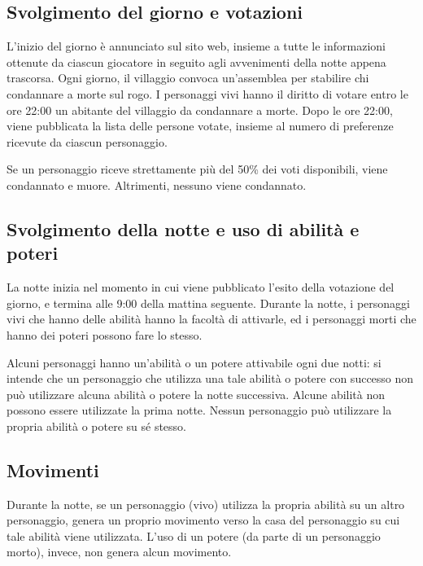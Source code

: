 \documentclass[a4paper,10pt]{article}
\begin{document}
\subsection{Svolgimento del giorno e votazioni}

L'inizio del giorno è annunciato sul sito web, insieme a tutte le informazioni ottenute da ciascun giocatore in seguito agli avvenimenti della notte appena trascorsa. Ogni giorno, il villaggio convoca un'assemblea per stabilire chi condannare a morte sul rogo. I personaggi vivi hanno il diritto di votare entro le ore 22:00 un abitante del villaggio da condannare a morte. Dopo le ore 22:00, viene pubblicata la lista delle persone votate, insieme al numero di preferenze ricevute da ciascun personaggio.

Se un personaggio riceve strettamente più del 50\% dei voti disponibili, viene condannato e muore. Altrimenti, nessuno viene condannato.

\subsection{Svolgimento della notte e uso di abilità e poteri}

La notte inizia nel momento in cui viene pubblicato l'esito della votazione del giorno, e termina alle 9:00 della mattina seguente. Durante la notte, i personaggi vivi che hanno delle abilità hanno la facoltà di attivarle, ed i personaggi morti che hanno dei poteri possono fare lo stesso.

Alcuni personaggi hanno un'abilità o un potere attivabile ogni due notti: si intende che un personaggio che utilizza una tale abilità o potere con successo non può utilizzare alcuna abilità o potere la notte successiva. Alcune abilità non possono essere utilizzate la prima notte. Nessun personaggio può utilizzare la propria abilità o potere su sé stesso.


\subsection{Movimenti}

Durante la notte, se un personaggio (vivo) utilizza la propria abilità su un altro personaggio, genera un proprio movimento verso la casa del personaggio su cui tale abilità viene utilizzata. L'uso di un potere (da parte di un personaggio morto), invece, non genera alcun movimento.
\end{document}
